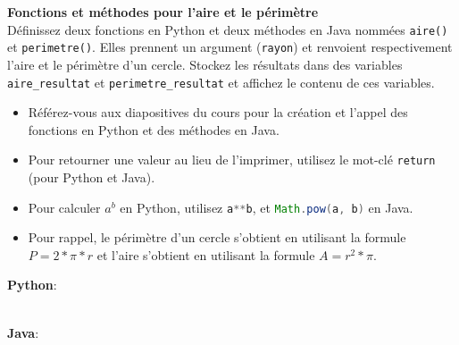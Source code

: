  \begin{Exercice} \textbf{Fonctions et méthodes pour l'aire et le périmètre}\\
      Définissez deux fonctions en Python et deux méthodes en Java nommées \lstinline{aire()} et \lstinline{perimetre()}. Elles prennent un argument (\lstinline{rayon}) et renvoient respectivement l'aire et le périmètre d'un cercle. Stockez les résultats dans des variables \lstinline{aire_resultat} et \lstinline{perimetre_resultat} et affichez le contenu de ces variables.   \\
     
      \begin{conseil}
          \begin{itemize}
              \item Référez-vous aux diapositives du cours pour la création et l'appel des fonctions en Python et des méthodes en Java.
              \item Pour retourner une valeur au lieu de l'imprimer, utilisez le mot-clé \lstinline{return} (pour Python et Java).
              \item Pour calculer $a^b$ en Python, utilisez \lstinline[language=python]|a**b|, et \lstinline[language=java]|Math.pow(a, b)| en Java.
              \item Pour rappel, le périmètre d'un cercle s'obtient en utilisant la formule $P = 2*\pi*r$ et l'aire s'obtient en utilisant la formule $A = r^2*\pi$. 
          \end{itemize}        
      \end{conseil}
      \begin{solution}
          \textbf{Python}:
          
      \end{solution}
      \begin{solution}
          \textbf{\\Java}:
          
      \end{solution}   
  \end{Exercice} 

